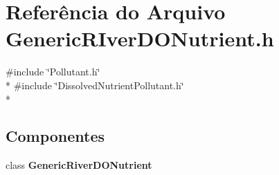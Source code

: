 \section{Referência do Arquivo Generic\+R\+Iver\+D\+O\+Nutrient.\+h}
\label{_generic_r_iver_d_o_nutrient_8h}
{\ttfamily \#include \char`\"{}Pollutant.\+h\char`\"{}}\\*
{\ttfamily \#include \char`\"{}Dissolved\+Nutrient\+Pollutant.\+h\char`\"{}}\\*
\subsection*{Componentes}
\begin{DoxyCompactItemize}
\item 
class {\bf Generic\+River\+D\+O\+Nutrient}
\end{DoxyCompactItemize}
